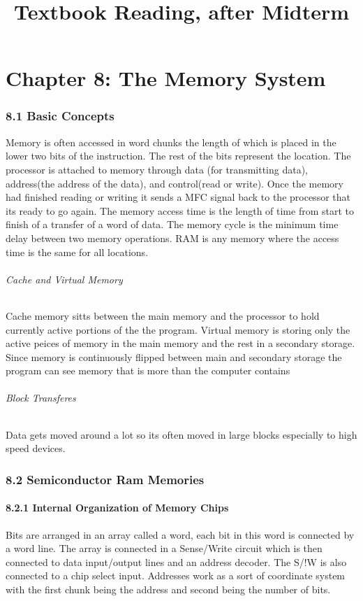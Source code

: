 \documentclass[12pt]{article}
\title{Textbook Reading, after Midterm}
\begin{document}
\part*{Chapter 8: The Memory System}
\section*{8.1 Basic Concepts}
Memory is often accessed in word chunks the length of which is placed in the lower two bits of the instruction. The rest of the bits represent the location.	The processor is attached to memory through data (for transmitting data), address(the address of the data), and control(read or write). Once the memory had finished reading or writing it sends a MFC signal back to the processor that its ready to go again. The memory access time is the length of time from start to finish of a transfer of a word of data. The memory cycle is the minimum time delay between two memory operations. RAM is any memory where the access time is the same for all locations. 
\paragraph*{Cache and Virtual Memory}
Cache memory sitts between the main memory and the processor to hold currently active portions of the the program. Virtual memory is storing only the active peices of memory in the main memory and the rest in a secondary storage. Since memory is continuously flipped between main and secondary storage the program can see memory that is more than the computer contains
\paragraph*{Block Transferes}
Data gets moved around a lot so its often moved in large blocks especially to high speed devices.
\section*{8.2 Semiconductor Ram Memories}
\subsection*{8.2.1 Internal Organization of Memory Chips}
Bits are arranged in an array called a word, each bit in this word is connected by a word line. The array is connected in a Sense/Write circuit which is then connected to data input/output lines and an address decoder. The S/!W is also connected to a chip select input. Addresses work as a sort of coordinate system with the first chunk being the address and second being the number of bits.
\end{document}
